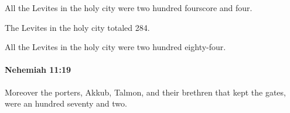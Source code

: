 			\begin{versebox}
					\item[BHS] 
					\item[LXX] 
					\item[ASV] All the Levites in the holy city were two hundred fourscore and four.
					\item[NIV] The Levites in the holy city totaled 284.
					\item[NRSV] All the Levites in the holy city were two hundred eighty-four.
			\end{versebox}

		\paragraph{Nehemiah 11:19} %
			\label{NEHEMIAH-11-19}

			Moreover the porters, Akkub, Talmon, and their brethren that kept the gates, were an hundred seventy and two.

